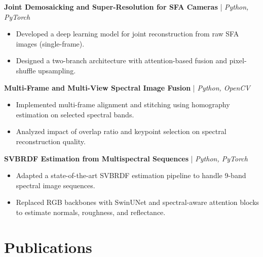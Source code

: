 \documentclass[a4paper,11pt]{article}
\begin{document}
\noindent \textbf{Joint Demosaicking and Super-Resolution for SFA Cameras} | \textit{Python, PyTorch}
\begin{itemize}
    \item Developed a deep learning model for joint reconstruction from raw SFA images (single-frame).
    \item Designed a two-branch architecture with attention-based fusion and pixel-shuffle upsampling.
\end{itemize}

\noindent \textbf{Multi-Frame and Multi-View Spectral Image Fusion} | \textit{Python, OpenCV}
\begin{itemize}
    \item Implemented multi-frame alignment and stitching using homography estimation on selected spectral bands.
    \item Analyzed impact of overlap ratio and keypoint selection on spectral reconstruction quality.
\end{itemize}

\noindent \textbf{SVBRDF Estimation from Multispectral Sequences} | \textit{Python, PyTorch}
\begin{itemize}
    \item Adapted a state-of-the-art SVBRDF estimation pipeline to handle 9-band spectral image sequences.
    \item Replaced RGB backbones with SwinUNet and spectral-aware attention blocks to estimate normals, roughness, and reflectance.
\end{itemize}


\section{Publications}
\end{document}
